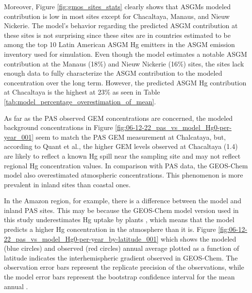 \begin{flushleft}
Moreover, Figure \ref{fig:gmos_sites_stats} clearly shows that ASGMs modeled contribution is low in most sites except for Chacaltaya, Manaus, and Nieuw Nickerie. The model's behavior regarding the predicted ASGM contribution at these sites is not surprising since these sites are in countries estimated to be among the top 10 Latin American ASGM Hg emitters in the ASGM emission inventory used for \gc simulation. Even though the model estimates a notable ASGM contribution at the Manaus (18\%) and Nieuw Nickerie (16\%) sites, the sites lack enough data to fully characterize the ASGM contribution to the modeled \hg concentration over the long term. However, the predicted  ASGM Hg contribution at Chacaltaya is the highest at 23\% as seen in Table \ref{tab:model_percentage_overestimation_of_mean}. 
\end{flushleft}
\newpage
\begin{flushleft}
 As far as the PAS observed GEM concentrations are concerned, the modeled background \hg concentrations in Figure \ref{fig:06-12-22_pas_vs_model_Hg0-per-year_001} seem to match the PAS GEM measurement at Chalcataya, but, according to Quant et al.\cite{quant_measuring_2021}, the higher GEM levels observed at Chacaltaya (1.4\nang) are likely to reflect a known Hg spill near the sampling site and may not reflect regional Hg concentration values. In comparison with PAS data, the GEOS-Chem model also overestimated atmospheric concentrations. This phenomenon is more prevalent in inland sites than coastal ones. 
 
 \end{flushleft}

\begin{flushleft}
 In the Amazon region, for example, there is a difference between the model and inland PAS sites. This may be because the GEOS-Chem model version used in this study underestimates Hg uptake by plants \cite{feinberg_evaluating_2022}, which means that the model predicts a higher Hg concentration in the atmosphere than it is. Figure \ref{fig:06-12-22_pas_vs_model_Hg0-per-year_by-latitude_001} which shows the modeled (blue circles) and observed (red circles) annual average \hg plotted as a function of latitude indicates the interhemispheric gradient observed in GEOS-Chem. The observation error bars represent the replicate precision of the observations, while the model error bars represent the \nft bootstrap confidence interval for the mean annual \hg. 
\end{flushleft}
 
